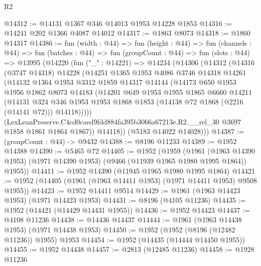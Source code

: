 \begin{lexlean}{R2}
\begin{coremodule}
@14312 := @14131 @1367 @346 @14013 @1953 @14228 @1853
@14316 := @14241 @202 @1366 @4087 @14012
@14317 := @1863 @8073
@14318 := @1860 @14317
@14386 := fun (width : @44) =>
  fun (height : @44) =>
  fun (channels : @44) =>
  fun (batches : @44) =>
  fun (groupCount : @44) =>
  fun (slots : @44) =>
  @13995
    (@14220
      (fun ("_" : @14221) =>
      @14234
        (@14306
          (@14312
            (@14316
              (@3747 @14318)
              @14228
              (@14251
                @1365
                @1953
                @4086
                @3746
                @14318
                @14261
                (@14132
                  @1364
                  @1953
                  @3312
                  @1859
                  @14317
                  @14144
                  (@14173
                    @650
                    @1953
                    @1956
                    @1862
                    @8073
                    @14183
                    (@14201
                      @649
                      @1953
                      @1955
                      @1865
                      @6660
                      @14211
                      (@14131
                        @324
                        @346
                        @1953
                        @1953
                        @1868
                        @1853
                        (@14138 @72 @1868 (@2216 (@14141 @72)))
                        @14118)))))
              (LexLeanPreserve.C4cd0caed9fdd884fa395b3066a67213e.R2.__rel_30
                @3697
                @1858
                @1861
                @1864
                @1867))
            @14118))
        (@5183 @14022 @14028)))
@14387 := (groupCount : @44) -> @9432
@14388 := @8196 @11233
@14389 := @1952 @14388
@14390 := @5465 @72
@14405 := @1952
    (@1959
      (@1961
        (@1963 @14390 @1953)
        (@1971 @14390 @1953)
        (@9466 (@11939 @1965 @1980 @1995 @1864))
        @1955))
@14411 := @1952 @14390 (@11945 @1965 @1980 @1995 @1864)
@14421 := @1952 (@14405 (@1961 (@1963 @14411 @1953) (@1971 @14411 @1953) @9508 @1955))
@14423 := @1952 @14411 @9514
@14429 := @1961 (@1963 @14423 @1953) (@1971 @14423 @1953)
@14431 := @8196 (@4105 @11236)
@14435 := @1952 (@14421 (@14429 @14431 @1955))
@14436 := @1952 @14423
@14437 := @4108 @11236
@14438 := @14436 @14437
@14444 := @1961 (@1963 @14438 @1953) (@1971 @14438 @1953)
@14450 := @1952 (@1952 (@8196 (@12482 @11236)) @1955) @1953
@14454 := @1952 (@14435 (@14444 @14450 @1955))
@14455 := @1952 @14438
@14457 := @2813 (@12485 @11236)
@14458 := @1928 @11236

\end{coremodule}
\end{lexlean}
